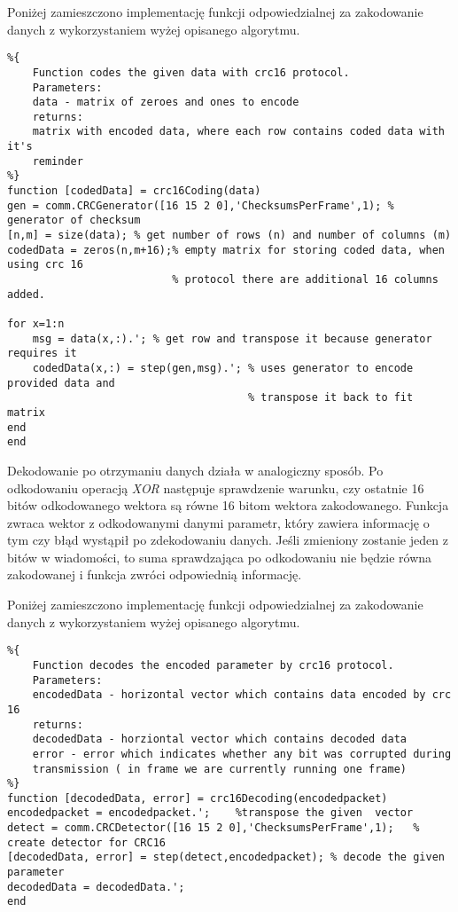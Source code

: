 \documentclass{article}
\begin{document}
\vspace{2mm}
\noindent
Poniżej zamieszczono implementację funkcji odpowiedzialnej za zakodowanie danych z wykorzystaniem wyżej opisanego algorytmu.

\begin{verbatim}
%{
    Function codes the given data with crc16 protocol.
    Parameters:
    data - matrix of zeroes and ones to encode
    returns:
    matrix with encoded data, where each row contains coded data with it's
    reminder
%}
function [codedData] = crc16Coding(data)
gen = comm.CRCGenerator([16 15 2 0],'ChecksumsPerFrame',1); % generator of checksum
[n,m] = size(data); % get number of rows (n) and number of columns (m)
codedData = zeros(n,m+16);% empty matrix for storing coded data, when using crc 16 
                          % protocol there are additional 16 columns added.

for x=1:n
    msg = data(x,:).'; % get row and transpose it because generator requires it
    codedData(x,:) = step(gen,msg).'; % uses generator to encode provided data and  
                                      % transpose it back to fit matrix
end
end
\end{verbatim}

Dekodowanie po otrzymaniu danych działa w analogiczny sposób. Po odkodowaniu operacją \textit{XOR} następuje sprawdzenie warunku, czy ostatnie 16 bitów odkodowanego wektora są równe 16 bitom wektora zakodowanego. Funkcja zwraca wektor z odkodowanymi danymi parametr, który zawiera informację o tym czy błąd wystąpił po zdekodowaniu danych. Jeśli zmieniony zostanie jeden z bitów w wiadomości, to suma sprawdzająca po odkodowaniu nie będzie równa zakodowanej i funkcja zwróci odpowiednią informację.

\vspace{2mm}
\noindent
Poniżej zamieszczono implementację funkcji odpowiedzialnej za zakodowanie danych z wykorzystaniem wyżej opisanego algorytmu.

\newpage

\begin{verbatim}
%{
    Function decodes the encoded parameter by crc16 protocol.
    Parameters:
    encodedData - horizontal vector which contains data encoded by crc 16
    returns:
    decodedData - horziontal vector which contains decoded data
    error - error which indicates whether any bit was corrupted during
    transmission ( in frame we are currently running one frame)
%}
function [decodedData, error] = crc16Decoding(encodedpacket)
encodedpacket = encodedpacket.';    %transpose the given  vector
detect = comm.CRCDetector([16 15 2 0],'ChecksumsPerFrame',1);   % create detector for CRC16
[decodedData, error] = step(detect,encodedpacket); % decode the given parameter
decodedData = decodedData.';
end
\end{verbatim}
\end{document}
